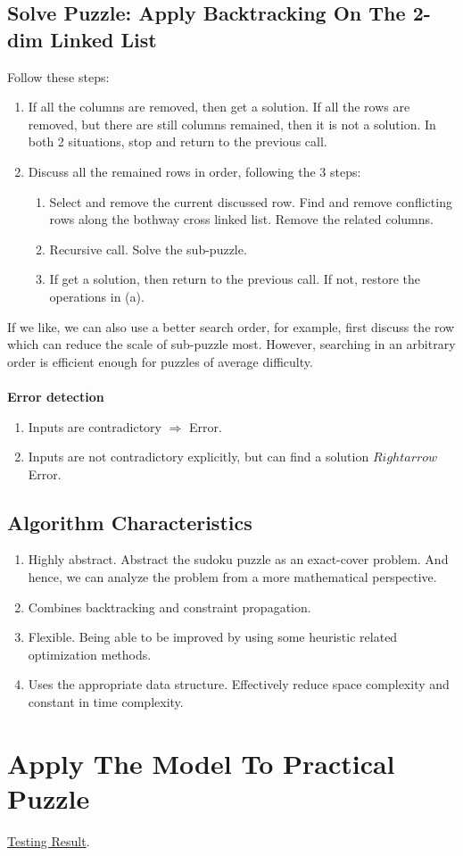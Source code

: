 \documentclass{article}
\begin{document}
\subsection{Solve Puzzle: Apply Backtracking On The 2-dim Linked List}
Follow these steps:
\begin{enumerate}
    \item If all the columns are removed, then get a solution. If all the rows are removed, but there are still columns remained, then it is not a solution. In both 2 situations, stop and return to the previous call.
    \item Discuss all the remained rows in order, following the 3 steps:
        \begin{enumerate}
            \item Select and remove the current discussed row. Find and remove conflicting rows along the bothway cross linked list. Remove the related columns.
            \item Recursive call. Solve the sub-puzzle.
            \item If get a solution, then return to the previous call. If not, restore the operations in (a).
        \end{enumerate}  
\end{enumerate}
If we like, we can also use a better search order, for example, first discuss the row which can reduce the scale of sub-puzzle most. However, searching in an arbitrary order is efficient enough for puzzles of average difficulty.
\\~\\
\textbf{Error detection}
\begin{enumerate}
    \item Inputs are contradictory $\Rightarrow$ Error.
    \item Inputs are not contradictory explicitly, but can find a solution $Rightarrow$ Error.
\end{enumerate}
\subsection{Algorithm Characteristics}
\begin{enumerate}
    \item Highly abstract. Abstract the sudoku puzzle as an exact-cover problem. And hence, we can analyze the problem from a more mathematical perspective.
    \item Combines backtracking and constraint propagation.
    \item Flexible. Being able to be improved by using some heuristic related optimization methods.
    \item Uses the appropriate data structure. Effectively reduce space complexity and constant in time complexity.
\end{enumerate}

\section{Apply The Model To Practical Puzzle}
\href{run:/../result/show.html}{Testing Result}.
\end{document}
